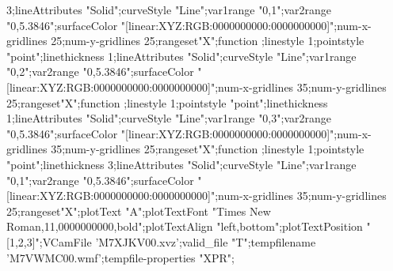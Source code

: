 \documentclass{article}
\begin{document}
{{3;lineAttributes "Solid";curveStyle "Line";var1range "0,1";var2range
"0,5.3846";surfaceColor
"[linear:XYZ:RGB:0000000000:0000000000]";num-x-gridlines 25;num-y-gridlines
25;rangeset"X";function ;linestyle
1;pointstyle "point";linethickness 1;lineAttributes "Solid";curveStyle
"Line";var1range "0,2";var2range "0,5.3846";surfaceColor
"[linear:XYZ:RGB:0000000000:0000000000]";num-x-gridlines 35;num-y-gridlines
25;rangeset"X";function ;linestyle
1;pointstyle "point";linethickness 1;lineAttributes "Solid";curveStyle
"Line";var1range "0,3";var2range "0,5.3846";surfaceColor
"[linear:XYZ:RGB:0000000000:0000000000]";num-x-gridlines 35;num-y-gridlines
25;rangeset"X";function ;linestyle 1;pointstyle "point";linethickness
3;lineAttributes "Solid";curveStyle "Line";var1range "0,1";var2range
"0,5.3846";surfaceColor
"[linear:XYZ:RGB:0000000000:0000000000]";num-x-gridlines 35;num-y-gridlines
25;rangeset"X";plotText "A";plotTextFont "Times New
Roman,11,0000000000,bold";plotTextAlign "left,bottom";plotTextPosition
"[1,2,3]";VCamFile 'M7XJKV00.xvz';valid_file "T";tempfilename
'M7VWMC00.wmf';tempfile-properties "XPR";}}
\end{document}
